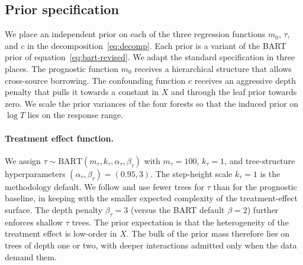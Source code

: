 \newpage
\subsection*{Prior specification}

We place an independent prior on each of the three regression functions $m_0$, $\tau$, and $c$ in the decomposition~\eqref{eq:decomp}.
Each prior is a variant of the BART prior of equation~\eqref{eq:bart-revised}.
We adapt the standard specification in three places.
The prognostic function $m_0$ receives a hierarchical structure that allows cross-source borrowing.
The confounding function $c$ receives an aggressive depth penalty that pulls it towards a constant in $X$ and through the leaf prior towards zero.
We scale the prior variances of the four forests so that the induced prior on $\log T$ lies on the response range.

\paragraph{Treatment effect function.}
We assign $\tau \sim \mathrm{BART}(m_\tau, k_\tau, \alpha_\tau, \beta_\tau)$ with $m_\tau = 100$, $k_\tau = 1$, and tree-structure hyperparameters $(\alpha_\tau, \beta_\tau) = (0.95, 3)$.
The step-height scale $k_\tau = 1$ is the methodology default.
We follow \citet{hahn2020bayesian} and use fewer trees for $\tau$ than for the prognostic baseline, in keeping with the smaller expected complexity of the treatment-effect surface.
The depth penalty $\beta_\tau = 3$ (versus the BART default $\beta = 2$) further enforces shallow $\tau$ trees.
The prior expectation is that the heterogeneity of the treatment effect is low-order in $X$.
The bulk of the prior mass therefore lies on trees of depth one or two, with deeper interactions admitted only when the data demand them.

